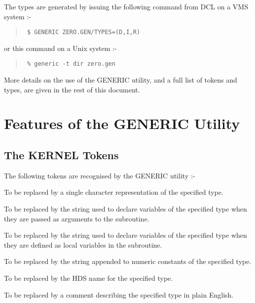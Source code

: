The types are generated by issuing the following command from DCL on a VMS
system :-

\begin{quote}{\tt
\$ GENERIC ZERO.GEN/TYPES=(D,I,R)
}
\end{quote}

or this command on a Unix system :-

\begin{quote}{\tt
\% generic -t dir zero.gen
}
\end{quote}

More details on the use of the GENERIC utility, and a full list of 
tokens and types, are given in the rest of this document.

\section{Features of the GENERIC Utility}

\subsection{The KERNEL Tokens}

The following tokens are recognised by the GENERIC utility :-

\newlength{\numlen}
\settowidth{\numlen}{000000000000}
\settowidth{\labelsep}{000}

\begin{list}{}{\setlength{\labelwidth}{\numlen}\setlength{\leftmargin}{\numlen}
\addtolength{\leftmargin}{\labelsep}}

\item[\verb+<T>+] To be replaced by a single character representation
of the specified type.

\item[\verb+<TYPE>+] To be replaced by the string used to declare variables
of the specified type when they are passed as arguments to
the subroutine.

\item[\verb+<LTYPE>+] To be replaced by the string used to declare variables
of the specified type when they are defined as local variables
in the subroutine.

\item[\verb+<CONST>+] To be replaced by the string appended to numeric constants
of the specified type.

\item[\verb+<HTYPE>+] To be replaced by the HDS name for the specified type.

\item[\verb+<COMM>+] To be replaced by a comment describing the specified type
in plain English.

\end{list}


